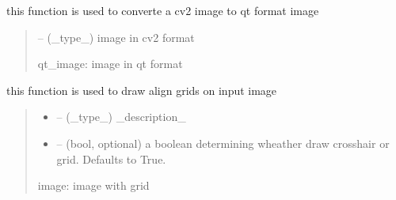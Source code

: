 \documentclass[letterpaper,10pt,english]{sphinxmanual}
\begin{document}

\begin{savenotes}\begin{fulllineitems}
\label{\detokenize{setting/backend/camera_funcs:oxin.backend.camera_funcs.convert_cv2_to_qt_image}}
\pysigstartsignatures
{}
\pysigstopsignatures
\sphinxAtStartPar
this function is used to converte a cv2 image to qt format image
\begin{quote}\begin{description}
\sphinxAtStartPar
{} – (\_type\_) image in cv2 format

\sphinxAtStartPar
qt\_image: image in qt format

\end{description}\end{quote}

\end{fulllineitems}\end{savenotes}


\begin{savenotes}\begin{fulllineitems}
\label{\detokenize{setting/backend/camera_funcs:oxin.backend.camera_funcs.draw_grid}}
\pysigstartsignatures
{}
\pysigstopsignatures
\sphinxAtStartPar
this function is used to draw align grids on input image
\begin{quote}\begin{description}
\begin{itemize}
\item {} 
\sphinxAtStartPar
{} – (\_type\_) \_description\_

\item {} 
\sphinxAtStartPar
{} – (bool, optional) a boolean determining wheather draw cross\sphinxhyphen{}hair or grid. Defaults to True.

\end{itemize}

\sphinxAtStartPar
image: image with grid

\end{description}\end{quote}

\end{fulllineitems}\end{savenotes}
\end{document}
